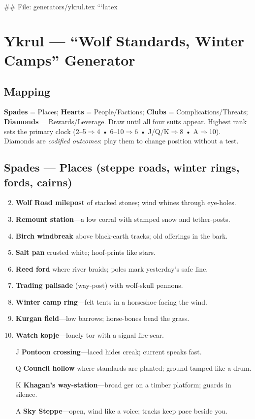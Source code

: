 ## File: generators/ykrul.tex
```latex
\chapter{Ykrul --- ``Wolf Standards, Winter Camps'' Generator}

\section*{Mapping}
\textbf{Spades} = Places; \textbf{Hearts} = People/Factions; \textbf{Clubs} = Complications/Threats; \textbf{Diamonds} = Rewards/Leverage. Draw until all four suits appear. Highest rank sets the primary clock (2--5$\Rightarrow$4 • 6--10$\Rightarrow$6 • J/Q/K$\Rightarrow$8 • A$\Rightarrow$10). Diamonds are \emph{codified outcomes}: play them to change position without a test.

\section*{\textbf{Spades} --- Places (steppe roads, winter rings, fords, cairns)}
\begin{enumerate}
\setcounter{enumi}{1}
\item \textbf{Wolf Road milepost} of stacked stones; wind whines through eye-holes.
\item \textbf{Remount station}---a low corral with stamped snow and tether-posts.
\item \textbf{Birch windbreak} above black-earth tracks; old offerings in the bark.
\item \textbf{Salt pan} crusted white; hoof-prints like stars.
\item \textbf{Reed ford} where river braids; poles mark yesterday's safe line.
\item \textbf{Trading palisade} (way-post) with wolf-skull pennons.
\item \textbf{Winter camp ring}---felt tents in a horseshoe facing the wind.
\item \textbf{Kurgan field}---low barrows; horse-bones bead the grass.
\item \textbf{Watch kopje}---lonely tor with a signal fire-scar.
\item[J] \textbf{Pontoon crossing}---laced hides creak; current speaks fast.
\item[Q] \textbf{Council hollow} where standards are planted; ground tamped like a drum.
\item[K] \textbf{Khagan's way-station}---broad ger on a timber platform; guards in silence.
\item[A] \textbf{Sky Steppe}---open, wind like a voice; tracks keep pace beside you.
\end{enumerate}

